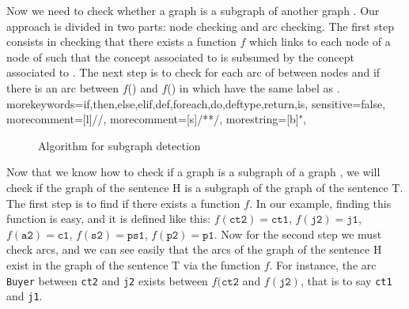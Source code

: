 \documentclass{esslli}
\newcommand{\dl}[1]{\texttt{#1}}
\begin{document}
Now we need to check whether a graph  is a subgraph of another
graph . Our approach is divided in two parts: node checking and
arc checking.  The first step consists in checking that there exists
a function $f$ which links to each node  of  a node
 of  such that the concept associated to  is
subsumed by the concept associated to .  The next step is to
check for each arc  of  between nodes  and
 if there is an arc between $f$() and $f$()
in  which have the same label as .
  {morekeywords={if,then,else,elif,def,foreach,do,deftype,return,is},
  sensitive=false,
  morecomment=[l]{//},
  morecomment=[s]{/*}{*/},
  morestring=[b]",
}
\begin{figure}[h!]
\centering

 \begin{tiny}
\end{tiny}
\caption{Algorithm for subgraph detection \label{algodet}}
\end{figure}

Now that we know how to check if a graph  is a subgraph of a
graph , we will check if the graph of the sentence H is a
subgraph of the graph of the sentence T. The first step is to find if
there exists a function $f$. In our example, finding this function is
easy, and it is defined like this: $f(\dl{ct2})=\dl{ct1}$,
$f(\dl{j2})=\dl{j1}$, $f(\dl{a2})=\dl{c1}$, $f(\dl{s2})=\dl{ps1}$,
$f(\dl{p2})=\dl{p1}$. Now for the second step we must check arcs, and
we can see easily that the arcs of the graph of the sentence H exist
in the graph of the sentence T via the function $f$. For instance, the
arc \dl{Buyer} between \dl{ct2} and \dl{j2} exists between
$f(\dl{ct2}$ and $f(\dl{j2})$, that is to say \dl{ct1} and \dl{j1}.
\end{document}

